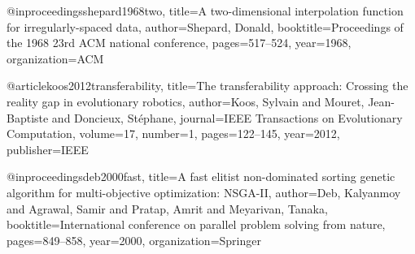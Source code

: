@inproceedings{shepard1968two,
  title={A two-dimensional interpolation function for irregularly-spaced data},
  author={Shepard, Donald},
  booktitle={Proceedings of the 1968 23rd ACM national conference},
  pages={517--524},
  year={1968},
  organization={ACM}
}

@article{koos2012transferability,
  title={The transferability approach: Crossing the reality gap in evolutionary robotics},
  author={Koos, Sylvain and Mouret, Jean-Baptiste and Doncieux, St{\'e}phane},
  journal={IEEE Transactions on Evolutionary Computation},
  volume={17},
  number={1},
  pages={122--145},
  year={2012},
  publisher={IEEE}
}

@inproceedings{deb2000fast,
  title={A fast elitist non-dominated sorting genetic algorithm for multi-objective optimization: NSGA-II},
  author={Deb, Kalyanmoy and Agrawal, Samir and Pratap, Amrit and Meyarivan, Tanaka},
  booktitle={International conference on parallel problem solving from nature},
  pages={849--858},
  year={2000},
  organization={Springer}
}